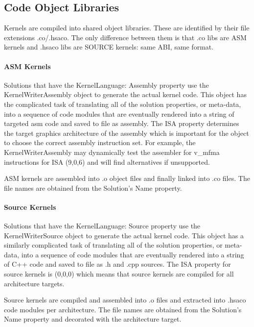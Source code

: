 \documentclass[]{article}
\begin{document}
\subsection{Code Object Libraries}

Kernels are compiled into shared object libraries. These are identified by their file extensions .co/.hsaco. The only difference between them is that .co libs are ASM kernels and .hsaco libs are SOURCE kernels: same ABI, same format.

\paragraph{ASM Kernels}

Solutions that have the KernelLanguage: Assembly property use the KernelWriterAssembly object to generate the actual kernel code. This object has the complicated task of translating all of the solution properties, or meta-data, into a sequence of code modules that are eventually rendered into a string of targeted asm code and saved to file as assembly. The ISA property determines the target graphics architecture of the assembly which is important for the object to choose the correct assembly instruction set. For example, the KernelWriterAssembly may dynamically test the assembler for v\_mfma instructions for ISA (9,0,6) and will find alternatives if unsupported.

ASM kernels are assembled into .o object files and finally linked into .co files. The file names are obtained from the Solution's Name property.

\paragraph{Source Kernels}

Solutions that have the KernelLanguage: Source property use the KernelWriterSource object to generate the actual kernel code. This object has a similarly complicated task of translating all of the solution properties, or meta-data, into a sequence of code modules that are eventually rendered into a string of C++ code and saved to file as .h and .cpp sources. The ISA property for source kernels is (0,0,0) which means that source kernels are compiled for all architecture targets.

Source kernels are compiled and assembled into .o files and extracted into .hsaco code modules per architecture. The file names are obtained from the Solution's Name property and decorated with the architecture target.
\end{document}
